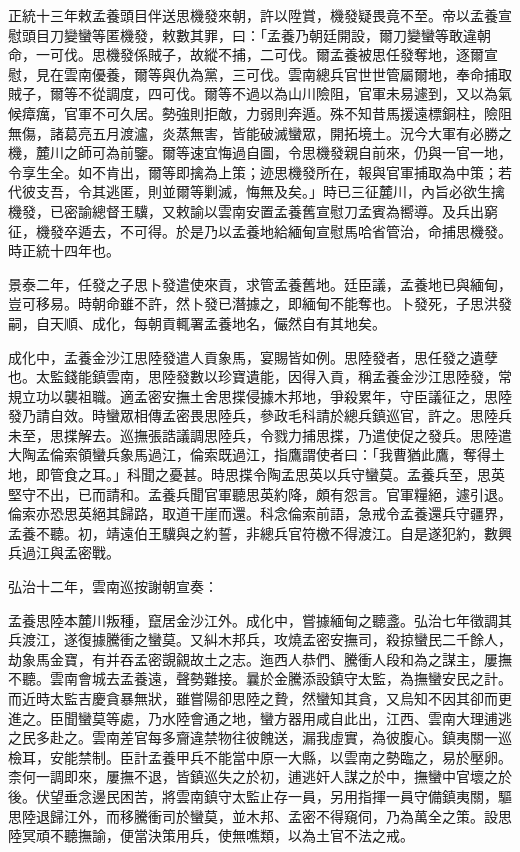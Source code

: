 \begin{pinyinscope}
正統十三年敕孟養頭目伴送思機發來朝，許以陞賞，機發疑畏竟不至。帝以孟養宣慰頭目刀變蠻等匿機發，敕數其罪，曰：「孟養乃朝廷開設，爾刀變蠻等敢違朝命，一可伐。思機發係賊子，故縱不捕，二可伐。爾孟養被思任發奪地，逐爾宣慰，見在雲南優養，爾等與仇為黨，三可伐。雲南總兵官世世管屬爾地，奉命捕取賊子，爾等不從調度，四可伐。爾等不過以為山川險阻，官軍未易遽到，又以為氣候瘴癘，官軍不可久居。勢強則拒敵，力弱則奔遁。殊不知昔馬援遠標銅柱，險阻無傷，諸葛亮五月渡瀘，炎蒸無害，皆能破滅蠻眾，開拓境土。況今大軍有必勝之機，麓川之師可為前鑒。爾等速宜悔過自圖，令思機發親自前來，仍與一官一地，令享生全。如不肯出，爾等即擒為上策；迹思機發所在，報與官軍捕取為中策；若代彼支吾，令其逃匿，則並爾等剿滅，悔無及矣。」時已三征麓川，內旨必欲生擒機發，已密諭總督王驥，又敕諭以雲南安置孟養舊宣慰刀孟賓為嚮導。及兵出窮征，機發卒遁去，不可得。於是乃以孟養地給緬甸宣慰馬哈省管治，命捕思機發。時正統十四年也。

景泰二年，任發之子思卜發遣使來貢，求管孟養舊地。廷臣議，孟養地已與緬甸，豈可移易。時朝命雖不許，然卜發已潛據之，即緬甸不能奪也。卜發死，子思洪發嗣，自天順、成化，每朝貢輒署孟養地名，儼然自有其地矣。

成化中，孟養金沙江思陸發遣人貢象馬，宴賜皆如例。思陸發者，思任發之遺孽也。太監錢能鎮雲南，思陸發數以珍寶遺能，因得入貢，稱孟養金沙江思陸發，常規立功以襲祖職。適孟密安撫土舍思揲侵據木邦地，爭殺累年，守臣議征之，思陸發乃請自效。時蠻眾相傳孟密畏思陸兵，參政毛科請於總兵鎮巡官，許之。思陸兵未至，思揲解去。巡撫張誥議調思陸兵，令戮力捕思揲，乃遣使促之發兵。思陸遣大陶孟倫索領蠻兵象馬過江，倫索既過江，指鷹謂使者曰：「我曹猶此鷹，奪得土地，即管食之耳。」科聞之憂甚。時思揲令陶孟思英以兵守蠻莫。孟養兵至，思英堅守不出，已而請和。孟養兵聞官軍聽思英約降，頗有怨言。官軍糧絕，遽引退。倫索亦恐思英絕其歸路，取道干崖而還。科念倫索前語，急戒令孟養還兵守疆界，孟養不聽。初，靖遠伯王驥與之約誓，非總兵官符檄不得渡江。自是遂犯約，數興兵過江與孟密戰。

弘治十二年，雲南巡按謝朝宣奏：

孟養思陸本麓川叛種，竄居金沙江外。成化中，嘗據緬甸之聽盞。弘治七年徵調其兵渡江，遂復據騰衝之蠻莫。又糾木邦兵，攻燒孟密安撫司，殺掠蠻民二千餘人，劫象馬金寶，有并吞孟密覬覦故土之志。迤西人恭們、騰衝人段和為之謀主，屢撫不聽。雲南會城去孟養遠，聲勢難接。曩於金騰添設鎮守太監，為撫蠻安民之計。而近時太監吉慶貪暴無狀，雖嘗陽卻思陸之贄，然蠻知其貪，又烏知不因其卻而更進之。臣聞蠻莫等處，乃水陸會通之地，蠻方器用咸自此出，江西、雲南大理逋逃之民多赴之。雲南差官每多齎違禁物往彼餽送，漏我虛實，為彼腹心。鎮夷關一巡檢耳，安能禁制。臣計孟養甲兵不能當中原一大縣，以雲南之勢臨之，易於壓卵。柰何一調即來，屢撫不退，皆鎮巡失之於初，逋逃奸人謀之於中，撫蠻中官壞之於後。伏望垂念邊民困苦，將雲南鎮守太監止存一員，另用指揮一員守備鎮夷關，驅思陸退歸江外，而移騰衝司於蠻莫，並木邦、孟密不得窺伺，乃為萬全之策。設思陸冥頑不聽撫諭，便當決策用兵，使無噍類，以為土官不法之戒。


\end{pinyinscope}
